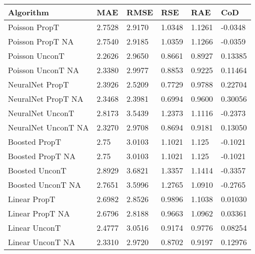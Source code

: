 \begin{table}[htb]
    \begin{tabularx}{\textwidth}{|Y|L{0.10\textwidth}|L{0.10\textwidth}|L{0.08\textwidth}|L{0.08\textwidth}|L{0.12\textwidth}|}
        \hline
        \textbf{Algorithm} &
        \textbf{MAE} &
        \textbf{RMSE} &
        \textbf{RSE} &
        \textbf{RAE} &
        \textbf{CoD} \\ \hline
        Poisson PropT		                & 2.7528		& 2.9170		& 1.0348		& 1.1261		& -0.0348   \\
        Poisson PropT NA	                & 2.7540		& 2.9185		& 1.0359		& 1.1266		& -0.0359	\\
        \hline
        Poisson UnconT                      & 2.2626		& 2.9650		& 0.8661		& 0.8927		& 0.13385 	\\
        Poisson UnconT NA                   & 2.3380		& 2.9977		& 0.8853		& 0.9225		& 0.11464 	\\
        \hline
        NeuralNet PropT		                & 2.3926		& 2.5209		& 0.7729		& 0.9788		& 0.22704   \\
        NeuralNet PropT NA	                & 2.3468		& 2.3981		& 0.6994		& 0.9600		& 0.30056   \\
        \hline
        NeuralNet UnconT                    & 2.8173		& 3.5439		& 1.2373		& 1.1116		& -0.2373 	\\
        NeuralNet UnconT NA                 & 2.3270		& 2.9708		& 0.8694		& 0.9181		& 0.13050 	\\
        \hline
        Boosted PropT		                & 2.75  		& 3.0103		& 1.1021		& 1.125 		& -0.1021   \\
        Boosted PropT NA	                & 2.75  		& 3.0103		& 1.1021		& 1.125 		& -0.1021   \\
        \hline
        Boosted UnconT                      & 2.8929		& 3.6821		& 1.3357		& 1.1414		& -0.3357 	\\
        Boosted UnconT NA                   & 2.7651		& 3.5996		& 1.2765		& 1.0910		& -0.2765 	\\
        \hline
        Linear PropT		                & 2.6982		& 2.8526		& 0.9896		& 1.1038		& 0.01030   \\
        Linear PropT NA		                & 2.6796		& 2.8188		& 0.9663		& 1.0962		& 0.03361   \\
        \hline
        Linear UnconT                       & 2.4777		& 3.0516		& 0.9174		& 0.9776		& 0.08254 	\\
        Linear UnconT NA                    & 2.3310		& 2.9720		& 0.8702		& 0.9197		& 0.12976 	\\

\end{tabularx}
\end{table}
